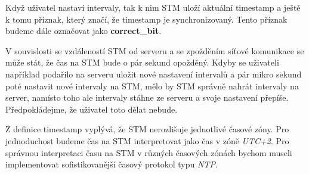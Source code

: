 Když uživatel nastaví intervaly, tak k nim STM uloží aktuální timestamp
a ještě k tomu příznak, který značí, že timestamp je synchronizovaný.
Tento příznak budeme dále označovat jako \textbf{correct\_bit}.

V souvislosti se vzdáleností STM od serveru a se zpožděním síťové komunikace se může
stát, že čas na STM bude o pár sekund opožděný.
Kdyby se uživateli například podařilo na serveru uložit nové nastavení intervalů
a pár mikro sekund poté nastavit nové intervaly na STM, mělo by STM správně nahrát
intervaly na server, namísto toho ale intervaly stáhne ze serveru a svoje nastavení přepíše.
Předpokládejme, že uživatel toto dělat nebude.

Z definice timestamp vyplývá, že STM nerozlišuje jednotlivé časové zóny.
Pro jednoduchost budeme čas na STM interpretovat jako čas v zóně \emph{UTC+2}.
Pro správnou interpretaci času na STM v různých časových zónách bychom museli implementovat
sofistikovanější časový protokol typu \emph{NTP}.
